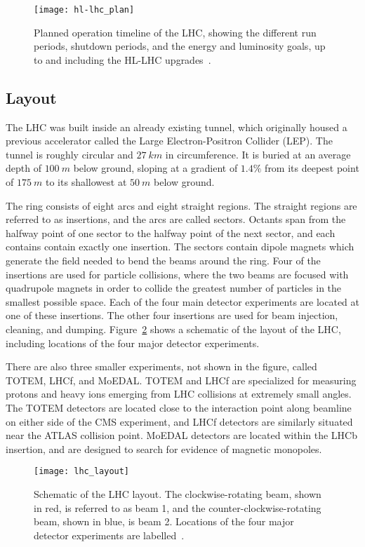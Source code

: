 \begin{figure}[!ht]\centering
\texttt{[image: hl-lhc\_plan]}
\caption{Planned operation timeline of the LHC, showing the different run periods, shutdown periods, and the energy and luminosity goals, up to and including the HL-LHC upgrades~\cite{atlas-hl-lhc}.}
\label{fig:hl-lhc_plan}
\end{figure}

\subsection{Layout}\label{subsec:lhc_layout}

The LHC was built inside an already existing tunnel,
which originally housed a previous accelerator called the Large Electron-Positron Collider (LEP).
The tunnel is roughly circular and $27~km$ in circumference.
It is buried at an average depth of $100~m$ below ground, sloping at a gradient of $1.4\%$ from its deepest point
of $175~m$ to its shallowest at $50~m$ below ground.

The ring consists of eight arcs and eight straight regions.
The straight regions are referred to as insertions, and the arcs are called sectors.
Octants span from the halfway point of one sector to the halfway point of the next sector, and each contains contain exactly one insertion.
The sectors contain dipole magnets which generate the field needed to bend the beams around the ring.
Four of the insertions are used for particle collisions, where the two beams are focused with quadrupole magnets in order to collide the greatest number of particles in the smallest possible space.
Each of the four main detector experiments are located at one of these insertions.
The other four insertions are used for beam injection, cleaning, and dumping.
Figure~\ref{fig:lhc_layout} shows a schematic of the layout of the LHC, including locations of the four major detector experiments.

There are also three smaller experiments, not shown in the figure, called TOTEM, LHCf, and MoEDAL.
TOTEM and LHCf are specialized for measuring protons and heavy ions emerging from LHC collisions at extremely small angles.
The TOTEM detectors are located close to the interaction point along beamline on either side of the CMS experiment, and LHCf detectors are similarly situated near the ATLAS collision point.
MoEDAL detectors are located within the LHCb insertion, and are designed to search for evidence of magnetic monopoles.

\begin{figure}[!ht]\centering
\texttt{[image: lhc\_layout]}
\caption{Schematic of the LHC layout.
The clockwise-rotating beam, shown in red, is referred to as beam 1, and the counter-clockwise-rotating beam, shown in blue, is beam 2.
Locations of the four major detector experiments are labelled~\cite{lhc-machine-2008}.}
\label{fig:lhc_layout}
\end{figure}

